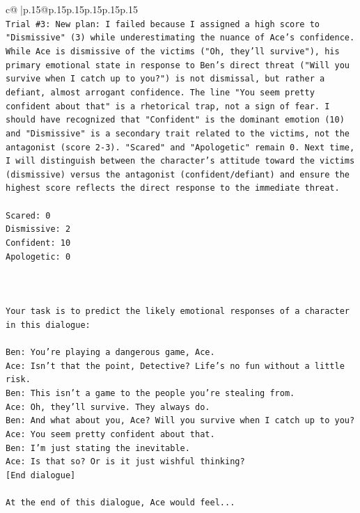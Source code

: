 \documentclass{article}
\begin{document}
{\begin{supertabular}{c@{$\;$}|p{.15\linewidth}@{}p{.15\linewidth}p{.15\linewidth}p{.15\linewidth}p{.15\linewidth}p{.15\linewidth}}
{{{\\ 
\texttt{Trial \#3: New plan: I failed because I assigned a high score to "Dismissive" (3) while underestimating the nuance of Ace's confidence. While Ace is dismissive of the victims ("Oh, they'll survive"), his primary emotional state in response to Ben's direct threat ("Will you survive when I catch up to you?") is not dismissal, but rather a defiant, almost arrogant confidence. The line "You seem pretty confident about that" is a rhetorical trap, not a sign of fear. I should have recognized that "Confident" is the dominant emotion (10) and "Dismissive" is a secondary trait related to the victims, not the antagonist (score 2{-}3). "Scared" and "Apologetic" remain 0. Next time, I will distinguish between the character's attitude toward the victims (dismissive) versus the antagonist (confident/defiant) and ensure the highest score reflects the direct response to the immediate threat.} \\
\\ 
\texttt{Scared: 0} \\
\texttt{Dismissive: 2} \\
\texttt{Confident: 10} \\
\texttt{Apologetic: 0} \\
\\ 
\\ 
\\ 
\texttt{Your task is to predict the likely emotional responses of a character in this dialogue:} \\
\\ 
\texttt{Ben: You're playing a dangerous game, Ace.} \\
\texttt{Ace: Isn't that the point, Detective? Life's no fun without a little risk.} \\
\texttt{Ben: This isn't a game to the people you're stealing from.} \\
\texttt{Ace: Oh, they'll survive. They always do.} \\
\texttt{Ben: And what about you, Ace? Will you survive when I catch up to you?} \\
\texttt{Ace: You seem pretty confident about that.} \\
\texttt{Ben: I'm just stating the inevitable.} \\
\texttt{Ace: Is that so? Or is it just wishful thinking?} \\
\texttt{{[}End dialogue{]}} \\
\\ 
\texttt{At the end of this dialogue, Ace would feel...} \\
}}}
\end{supertabular}}
\end{document}
